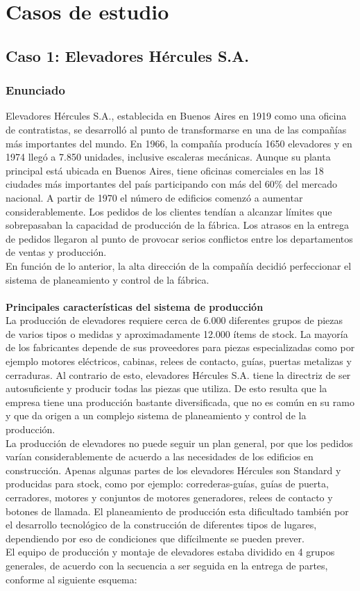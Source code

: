 \documentclass[a4paper,10pt]{article}
\begin{document}
\newpage
\section{Casos de estudio}
	\subsection{Caso 1: Elevadores Hércules S.A.}
		\subsubsection{Enunciado}
		Elevadores Hércules S.A., establecida en Buenos Aires en 1919 como una oficina de
contratistas, se desarrolló al punto de transformarse en una de las compañías más
importantes del mundo. En 1966, la compañía producía 1650 elevadores y en 1974
llegó a 7.850 unidades, inclusive escaleras mecánicas. Aunque su planta principal está
ubicada en Buenos Aires, tiene oficinas comerciales en las 18 ciudades más importantes
del país participando con más del 60\% del mercado nacional. A partir de 1970 el número
de edificios comenzó a aumentar considerablemente. Los pedidos de los clientes tendían
a alcanzar límites que sobrepasaban la capacidad de producción de la fábrica. Los
atrasos en la entrega de pedidos llegaron al punto de provocar serios conflictos entre los
departamentos de ventas y producción.\\
En función de lo anterior, la alta dirección de la compañía decidió perfeccionar el
sistema de planeamiento y control de la fábrica.\\ \\
\textbf{Principales características del sistema de producción}\\
La producción de elevadores requiere cerca de 6.000 diferentes grupos de piezas de
varios tipos o medidas y aproximadamente 12.000 ítems de stock. La mayoría de los
fabricantes depende de sus proveedores para piezas especializadas como por ejemplo
motores eléctricos, cabinas, relees de contacto, guías, puertas metalizas y cerraduras.
Al contrario de esto, elevadores Hércules S.A. tiene la directriz de ser autosuficiente y
producir todas las piezas que utiliza. De esto resulta que la empresa tiene una producción
bastante diversificada, que no es común en su ramo y que da origen a un complejo
sistema de planeamiento y control de la producción.\\
La producción de elevadores no puede seguir un plan general, por que los pedidos
varían considerablemente de acuerdo a las necesidades de los edificios en construcción.
Apenas algunas partes de los elevadores Hércules son Standard y producidas para stock,
como por ejemplo: correderas-guías, guías de puerta, cerradores, motores y conjuntos de
motores generadores, relees de contacto y botones de llamada. El planeamiento de
producción esta dificultado también por el desarrollo tecnológico de la construcción de
diferentes tipos de lugares, dependiendo por eso de condiciones que difícilmente se
pueden prever.\\
El equipo de producción y montaje de elevadores estaba dividido en 4 grupos generales,
de acuerdo con la secuencia a ser seguida en la entrega de partes, conforme al
siguiente esquema:
\end{document}
